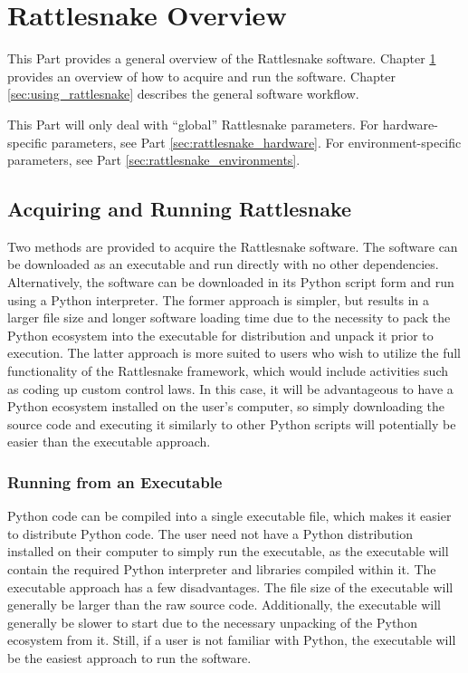 \documentclass[pdf,12pt,report]{SANDreport}
\begin{document}
    \part{Rattlesnake Overview}\label{sec:rattlesnake_overview}
    
    This Part provides a general overview of the Rattlesnake software.  Chapter \ref{sec:intro_running_rattlesnake} provides an overview of how to acquire and run the software.  Chapter \ref{sec:using_rattlesnake} describes the general software workflow.
    
    This Part will only deal with ``global'' Rattlesnake parameters.  For hardware-specific parameters, see Part \ref{sec:rattlesnake_hardware}.  For environment-specific parameters, see Part \ref{sec:rattlesnake_environments}.
    
    \chapter{Acquiring and Running Rattlesnake}\label{sec:intro_running_rattlesnake}

    Two methods are provided to acquire the Rattlesnake software.  The software can be downloaded as an executable and run directly with no other dependencies.  Alternatively, the software can be downloaded in its Python script form and run using a Python interpreter.  The former approach is simpler, but results in a larger file size and longer software loading time due to the necessity to pack the Python ecosystem into the executable for distribution and unpack it prior to execution.  The latter approach is more suited to users who wish to utilize the full functionality of the Rattlesnake framework, which would include activities such as coding up custom control laws.  In this case, it will be advantageous to have a Python ecosystem installed on the user's computer, so simply downloading the source code and executing it similarly to other Python scripts will potentially be easier than the executable approach.
    
    \section{Running from an Executable}\label{sec:intro_running_executable}
    Python code can be compiled into a single executable file, which makes it easier to distribute Python code.  The user need not have a Python distribution installed on their computer to simply run the executable, as the executable will contain the required Python interpreter and libraries compiled within it.  The executable approach has a few disadvantages.  The file size of the executable will generally be larger than the raw source code.  Additionally, the executable will generally be slower to start due to the necessary unpacking of the Python ecosystem from it.  Still, if a user is not familiar with Python, the executable will be the easiest approach to run the software.
    
\end{document}
